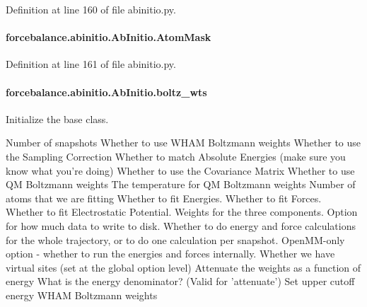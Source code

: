 Definition at line 160 of file abinitio.\-py.

\hypertarget{classforcebalance_1_1abinitio_1_1AbInitio_a09c8bbc29d2de7dbc471d56cbc574d5d}{
\paragraph[{Atom\-Mask}]{\setlength{\rightskip}{0pt plus 5cm}forcebalance.\-abinitio.\-Ab\-Initio.\-Atom\-Mask\hspace{0.3cm}{\ttfamily [inherited]}}}\label{classforcebalance_1_1abinitio_1_1AbInitio_a09c8bbc29d2de7dbc471d56cbc574d5d}


Definition at line 161 of file abinitio.\-py.

\hypertarget{classforcebalance_1_1abinitio_1_1AbInitio_ac442f096d11d0294235f2c8cbe1dcbb4}{
\paragraph[{boltz\-\_\-wts}]{\setlength{\rightskip}{0pt plus 5cm}forcebalance.\-abinitio.\-Ab\-Initio.\-boltz\-\_\-wts\hspace{0.3cm}{\ttfamily [inherited]}}}\label{classforcebalance_1_1abinitio_1_1AbInitio_ac442f096d11d0294235f2c8cbe1dcbb4}


Initialize the base class. 

Number of snapshots Whether to use W\-H\-A\-M Boltzmann weights Whether to use the Sampling Correction Whether to match Absolute Energies (make sure you know what you're doing) Whether to use the Covariance Matrix Whether to use Q\-M Boltzmann weights The temperature for Q\-M Boltzmann weights Number of atoms that we are fitting Whether to fit Energies. Whether to fit Forces. Whether to fit Electrostatic Potential. Weights for the three components. Option for how much data to write to disk. Whether to do energy and force calculations for the whole trajectory, or to do one calculation per snapshot. Open\-M\-M-\/only option -\/ whether to run the energies and forces internally. Whether we have virtual sites (set at the global option level) Attenuate the weights as a function of energy What is the energy denominator? (Valid for 'attenuate') Set upper cutoff energy W\-H\-A\-M Boltzmann weights 

